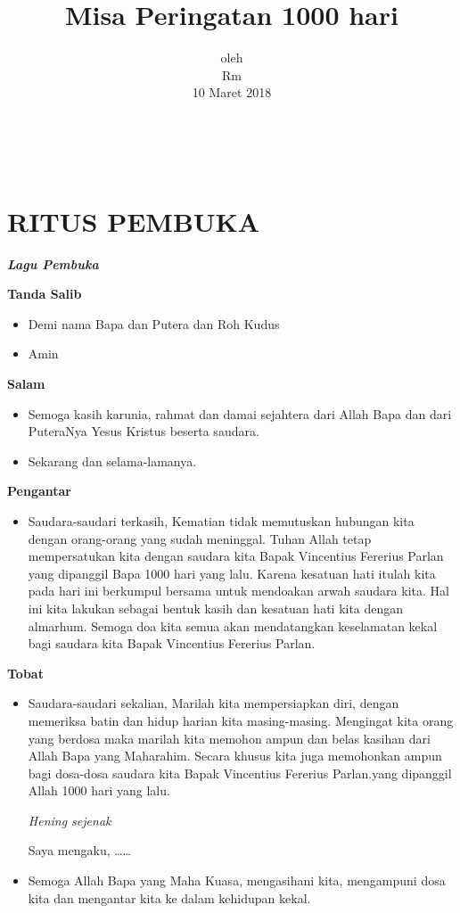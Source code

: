 \documentclass[titlepage,10pt,openany]{scrbook}
\title{Misa Peringatan 1000 hari}
\author{\namaalm}
\date{oleh \\ Rm \namaromo\\10 Maret 2018}
\makeatletter
\newcommand{\subjudul}[1]{%
  {\parindent \z@ 
    \interlinepenalty\@M \bfseries #1\par\nobreak \vskip 10\p@ }}
\newcommand{\lagu}[1]{%
  {\parindent \z@ 
    \interlinepenalty\@M \slshape \bfseries \normalsize \textit{#1}\par\nobreak \vskip 10\p@ }}
\newcommand{\BU}[1]{\begin{itemize} \item[U:] #1 \end{itemize}}
\newcommand{\BI}[1]{\begin{itemize} \item[I:] #1 \end{itemize}}
\newcommand{\namaalm}{Bapak Vincentius Fererius Parlan\xspace}
\makeatother
\begin{document}
\thispagestyle{empty}


\newpage
{~}
\thispagestyle{empty}
\newpage

\section*{RITUS PEMBUKA} 

 

\lagu{Lagu Pembuka}  
 

\subjudul{Tanda Salib} 

\BI{Demi nama  Bapa dan Putera dan Roh Kudus}

\BU{Amin}

 

\subjudul{Salam}

\BI{Semoga kasih karunia, rahmat dan damai sejahtera dari 
Allah Bapa dan dari PuteraNya Yesus Kristus beserta 
saudara.} 

\BU{Sekarang dan selama-lamanya.}

 

\subjudul{Pengantar}

\BI{Saudara-saudari terkasih, 
	Kematian tidak memutuskan hubungan kita dengan 
	orang-orang yang sudah meninggal. Tuhan Allah tetap 
	mempersatukan kita dengan saudara kita \namaalm yang 
	dipanggil Bapa 1000 hari yang lalu. Karena kesatuan hati 
	itulah kita pada hari ini berkumpul bersama untuk 
	mendoakan arwah saudara kita. Hal ini kita lakukan 
	sebagai bentuk kasih dan kesatuan hati kita dengan 
	almarhum. Semoga doa kita semua akan mendatangkan 
	keselamatan kekal bagi saudara kita \namaalm.}


\subjudul{Tobat}

\BI{Saudara-saudari sekalian, 
	Marilah kita mempersiapkan diri, dengan memeriksa 
	batin dan hidup harian kita masing-masing. Mengingat 
	kita orang yang berdosa maka marilah kita memohon ampun dan belas kasihan dari Allah Bapa yang 
	Maharahim. Secara khusus kita juga memohonkan ampun 
	bagi dosa-dosa saudara kita \namaalm.yang dipanggil Allah 
	1000 hari yang lalu. 
	
	\textit{Hening sejenak }
	
	

Saya mengaku, \ldots \ldots
} 



\BI{Semoga Allah Bapa yang Maha Kuasa, mengasihani kita, 
mengampuni dosa kita dan mengantar kita ke dalam 
kehidupan kekal.}
\end{document}
